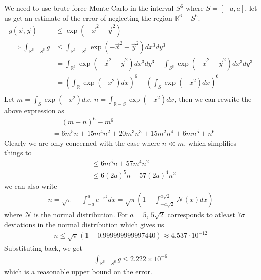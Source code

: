 \documentclass{article}
\begin{document}
We need to use brute force Monte Carlo in the interval $S^6$ where $S = [-a, a]$, let us get an estimate of the error of neglecting the region $\mathbb{R}^6 - S^6$.
\begin{align*}
    g(\vec{x}, \vec{y})                  & \leq \exp(-\vec{x}^2 - \vec{y}^2)                                                                           \\
    \implies \int_{\mathbb{R}^6 - S^6} g & \leq \int_{\mathbb{R}^6 - S^6} \exp(-\vec{x}^2 - \vec{y}^2) dx^3 dy^3                                       \\
                                         & = \int_{\mathbb{R}^6} \exp(-\vec{x}^2-\vec{y}^2)dx^3 dy^3 - \int_{S^6}  \exp(-\vec{x}^2-\vec{y}^2)dx^3 dy^3 \\
                                         & = \left(\int_{\mathbb{R}} \exp(-x^2) dx\right)^6 - \left(\int_S \exp(-x^2) dx\right)^6                      \\
\end{align*}
Let $m = \int_{S} \exp(-x^2) dx$, $n = \int_{\mathbb{R} - S} \exp(-x^2) dx$, then we can rewrite the above expression as
\begin{align*}
     & = (m + n)^6 - m^6                                               \\
     & = 6m^5 n + 15 m^4 n^2 + 20 m^3 n^3 + 15 m^2 n^4 + 6 m n^5 + n^6
\end{align*}
Clearly we are only concerned with the case where $n \ll m$, which simplifies things to
\begin{align*}
     & \leq 6m^5n + 57 m^4 n^2       \\
     & \leq 6(2a)^5n + 57 (2a)^4 n^2
\end{align*}
we can also write
\begin{align*}
    n = \sqrt{\pi} - \int_{-a}^{a} e^{-x^2} dx = \sqrt{\pi}\left(1 - \int_{-a\sqrt{2}}^{a\sqrt{2}} \mathcal{N}(x) dx \right)
\end{align*}
where $\mathcal{N}$ is the normal distribution.
For $a = 5$, $5\sqrt{2}$ corresponds to atleast $7\sigma$ deviations in the normal distribution which gives us
\begin{align*}
    n \leq \sqrt{\pi} (1 - 0.999999999997440) \approx 4.537 \cdot 10^{-12}
\end{align*}
Substituting back, we get
\begin{align*}
    \int_{\mathbb{R}^6 - S^6} g \leq 2.222 \times 10^{-6}
\end{align*}
which is a reasonable upper bound on the error.
\end{document}
